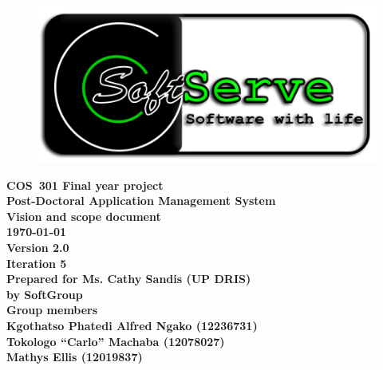 \documentclass[12pt]{article}
\newcommand{\Title}{Vision and scope document} %
\newcommand{\Class}{COS\ 301 Final year project} %
\newcommand{\ssr}{Soft\color{green}{Serve }\color{black}}
\newcommand{\version}{2.0}
\newcommand{\iteration}{5}
\newcommand{\client}{Ms. Cathy Sandis (UP DRIS)}
\newcommand{\project}{Post-Doctoral Application Management System}
\begin{document}
\vspace{4em}

\begin{center}%

\begin{figure}[ht!]
\centering
\includegraphics{../Images_Docs/logo.png}
\end{figure}
\LARGE \bf \Class \\[0.25em]
\LARGE \bf \project \\[1em]
\LARGE \bf \Title \\[0.25em]
\large \bf \today\\
\bf Version \version\\
\bf Iteration \iteration\\[0.5em]
\Large \bf Prepared for \client\\
\Large \bf by
\Large {\bf \ssr Group }\\[0.5em]
\LARGE {\bf Group members}\\[0.25em]
\large
Kgothatso Phatedi Alfred Ngako (12236731) \\[0.5em]
Tokologo “Carlo” Machaba (12078027) \\[0.5em]
Mathys Ellis (12019837) \\[8em]

\end{center}%

\end{document}
